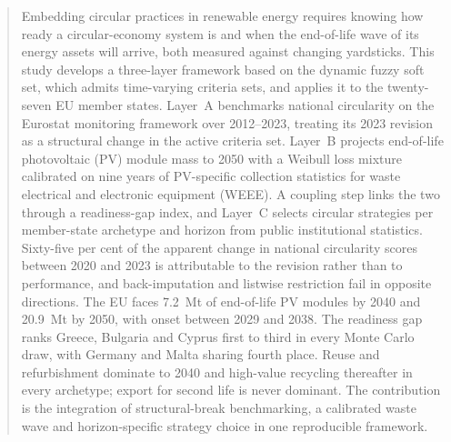 \documentclass[a4paper,fleqn]{cas-sc}
\begin{document}


\begin{abstract}
Embedding circular practices in renewable energy requires knowing how ready a circular-economy system is and when the end-of-life wave of its energy assets will arrive, both measured against changing yardsticks. This study develops a three-layer framework based on the dynamic fuzzy soft set, which admits time-varying criteria sets, and applies it to the twenty-seven EU member states. Layer~A benchmarks national circularity on the Eurostat monitoring framework over 2012--2023, treating its 2023 revision as a structural change in the active criteria set. Layer~B projects end-of-life photovoltaic (PV) module mass to 2050 with a Weibull loss mixture calibrated on nine years of PV-specific collection statistics for waste electrical and electronic equipment (WEEE). A coupling step links the two through a readiness-gap index, and Layer~C selects circular strategies per member-state archetype and horizon from public institutional statistics. Sixty-five per cent of the apparent change in national circularity scores between 2020 and 2023 is attributable to the revision rather than to performance, and back-imputation and listwise restriction fail in opposite directions. The EU faces \SI{7.2}{Mt} of end-of-life PV modules by 2040 and \SI{20.9}{Mt} by 2050, with onset between 2029 and 2038. The readiness gap ranks Greece, Bulgaria and Cyprus first to third in every Monte Carlo draw, with Germany and Malta sharing fourth place. Reuse and refurbishment dominate to 2040 and high-value recycling thereafter in every archetype; export for second life is never dominant. The contribution is the integration of structural-break benchmarking, a calibrated waste wave and horizon-specific strategy choice in one reproducible framework.
\end{abstract}

\end{document}
